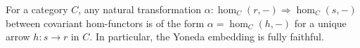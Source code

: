 For a category $C$, any natural transformation $\alpha: \hom_C(r, -) \Rightarrow \hom_C(s, -)$ between covariant hom-functors is of the form $\alpha = \hom_C(h, -)$ for a unique arrow $h: s \to r$ in $C$. In particular, the Yoneda embedding is fully faithful.
